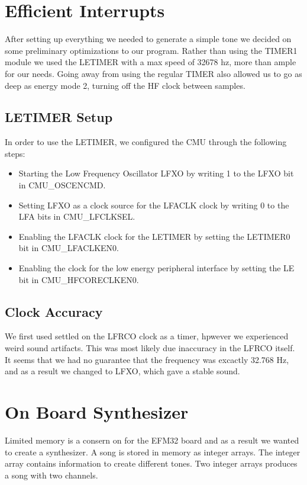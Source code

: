 \section{Efficient Interrupts}
After setting up everything we needed to generate a simple tone we decided on some preliminary optimizations to our program. Rather than using the TIMER1 module we used the LETIMER with a max speed of 32678 hz, more than ample for our needs. Going away from using the regular TIMER also allowed us to go as deep as energy mode 2, turning off the HF clock between samples.

\subsection{LETIMER Setup}
In order to use the LETIMER, we configured the CMU through the following steps:
\begin{itemize}
  \item Starting the Low Frequency Oscillator LFXO by writing 1 to the LFXO bit in CMU\_OSCENCMD.
  \item Setting LFXO as a clock source for the LFACLK clock by writing 0 to the LFA bits in CMU\_LFCLKSEL.
  \item Enabling the LFACLK clock for the LETIMER by setting the LETIMER0 bit in CMU\_LFACLKEN0.
  \item Enabling the clock for the low energy peripheral interface by setting the LE bit in CMU\_HFCORECLKEN0.
\end{itemize}

\subsection{Clock Accuracy}
We first used settled on the LFRCO clock as a timer, hpwever we experienced weird sound artifacts. This was most likely due inaccuracy in the LFRCO itself. It seems that we had no guarantee that the frequency was excactly 32.768 Hz, and as a result we changed to LFXO, which gave a stable sound.

\section{On Board Synthesizer}
Limited memory is a consern on for the EFM32 board and as a result we wanted to create a synthesizer. A song is stored in memory as integer arrays. The integer array contains information to create different tones. Two integer arrays produces a song with two channels.

